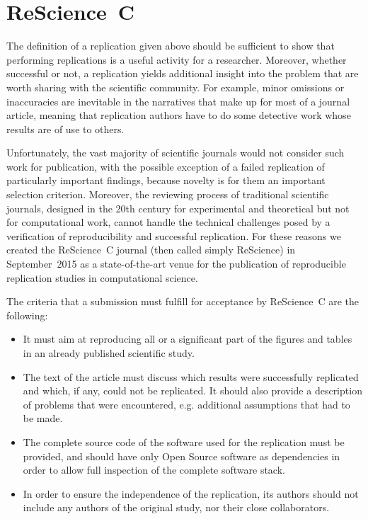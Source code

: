 \documentclass[runningheads]{llncs}
\begin{document}
\section{ReScience~C}

The definition of a replication given above should be sufficient to show that performing replications is a useful activity for a researcher. Moreover, whether successful or not, a replication yields additional insight into the problem that are worth sharing with the scientific community. For example, minor omissions or inaccuracies are inevitable in the narratives that make up for most of a journal article, meaning that replication authors have to do some detective work whose results are of use to others.

Unfortunately, the vast majority of scientific journals would not consider such work for publication, with the possible exception of a failed replication of particularly important findings, because novelty is for them an important selection criterion. Moreover, the reviewing process of traditional scientific journals, designed in the 20th century for experimental and theoretical but not for computational work, cannot handle the technical challenges posed by a verification of reproducibility and successful replication. For these reasons we created the ReScience~C journal (then called simply ReScience) in September~2015 as a state-of-the-art venue for the publication of reproducible replication studies in computational science.

The criteria that a submission must fulfill for acceptance by ReScience~C are the following:
\begin{itemize}
\item It must aim at reproducing all or a significant part of the figures and tables in an already published scientific study.
\item The text of the article must discuss which results were successfully replicated and which, if any, could not be replicated. It should also provide a description of problems that were encountered, e.g. additional assumptions that had to be made.
\item The complete source code of the software used for the replication must be provided, and should have only Open Source software as dependencies in order to allow full inspection of the complete software stack.
\item In order to ensure the independence of the replication, its authors should not include any authors of the original study, nor their close collaborators.
\end{itemize}
\end{document}
